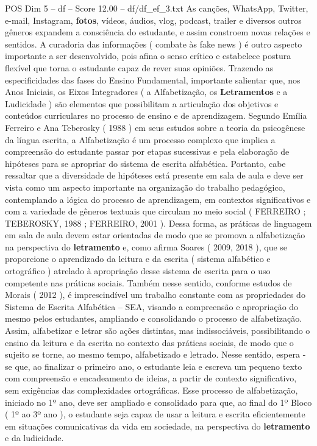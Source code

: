 \begin{textsample}{POS Dim 5 – df – Score 12.00 – df/df\_ef\_3.txt}
As canções, WhatsApp, Twitter, e-mail, Instagram, \textbf{fotos}, vídeos, áudios, vlog, podcast, trailer e diversos outros gêneros expandem a consciência do estudante, e assim constroem novas relações e sentidos.
A curadoria das informações ( combate às fake news ) é outro aspecto importante a ser desenvolvido, pois afina o senso crítico e estabelece postura flexível que torna o estudante capaz de rever suas opiniões.
Trazendo as especificidades das fases do Ensino Fundamental, importante salientar que, nos Anos Iniciais, os Eixos Integradores ( a Alfabetização, os \textbf{Letramentos} e a Ludicidade ) são elementos que possibilitam a articulação dos objetivos e conteúdos curriculares no processo de ensino e de aprendizagem.
Segundo Emília Ferreiro e Ana Teberosky ( 1988 ) em seus estudos sobre a teoria da psicogênese da língua escrita, a Alfabetização é um processo complexo que implica a compreensão do estudante passar por etapas sucessivas e pela elaboração de hipóteses para se apropriar do sistema de escrita alfabética.
Portanto, cabe ressaltar que a diversidade de hipóteses está presente em sala de aula e deve ser vista como um aspecto importante na organização do trabalho pedagógico, contemplando a lógica do processo de aprendizagem, em contextos significativos e com a variedade de gêneros textuais que circulam no meio social ( FERREIRO ; TEBEROSKY, 1988 ; FERREIRO, 2001 ).
Dessa forma, as práticas de linguagem em sala de aula devem estar orientadas de modo que se promova a alfabetização na perspectiva do \textbf{letramento} e, como afirma Soares ( 2009, 2018 ), que se proporcione o aprendizado da leitura e da escrita ( sistema alfabético e ortográfico ) atrelado à apropriação desse sistema de escrita para o uso competente nas práticas sociais.
Também nesse sentido, conforme estudos de Morais ( 2012 ), é imprescindível um trabalho constante com as propriedades do Sistema de Escrita Alfabética – SEA, visando a compreensão e apropriação do mesmo pelos estudantes, ampliando e consolidando o processo de alfabetização.
Assim, alfabetizar e letrar são ações distintas, mas indissociáveis, possibilitando o ensino da leitura e da escrita no contexto das práticas sociais, de modo que o sujeito se torne, ao mesmo tempo, alfabetizado e letrado.
Nesse sentido, espera -se que, ao finalizar o primeiro ano, o estudante leia e escreva um pequeno texto com compreensão e encadeamento de ideias, a partir de contexto significativo, sem exigências das complexidades ortográficas.
Esse processo de alfabetização, iniciado no 1º ano, deve ser ampliado e consolidado para que, ao final do 1º Bloco ( 1º ao 3º ano ), o estudante seja capaz de usar a leitura e escrita eficientemente em situações comunicativas da vida em sociedade, na perspectiva do \textbf{letramento} e da ludicidade.

\end{textsample}
